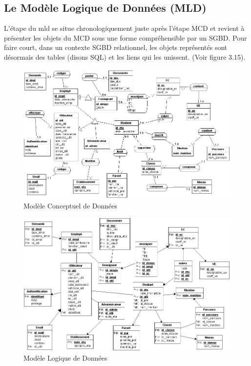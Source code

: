 \subsection{Le Modèle Logique de Données (MLD)}
L'étape du \gls{mld} se situe chronologiquement juste après l'étape MCD et revient à présenter les objets du MCD sous une forme compréhensible par un SGBD. Pour faire court, dans un contexte SGBD relationnel, les objets représentés sont
désormais des tables (disons SQL) et les liens qui les unissent. (Voir figure 3.15).

\newpage

\begin{landscape}
	\begin{figure}[h]
		\vspace*{-0.5cm}
		\centering
		\includegraphics[width=1\linewidth]{Chapitre3/images/merise/MCD}
		\caption{Modèle Conceptuel de Données}
		\label{Modèle Conceptuel de Données}
	\end{figure}	
\end{landscape}

\newpage

\begin{landscape}
	\begin{figure}[h]	
		\vspace*{-1cm}
		\centering
		\includegraphics[width=1\linewidth]{Chapitre3/images/merise/MLD}
		\caption{Modèle Logique de Données}
		\label{Modèle Logique de Données}
	\end{figure}	
\end{landscape}

